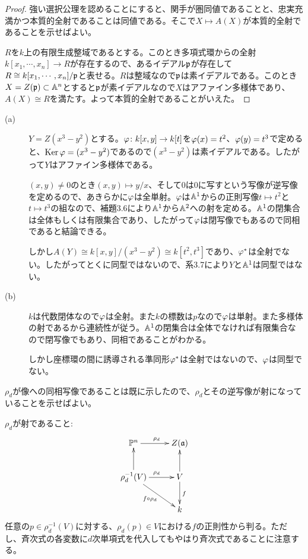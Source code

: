 \begin{proof}
  強い選択公理を認めることにすると、関手が圏同値であることと、忠実充満かつ本質的全射であることは同値である。そこで$X \mapsto A(X)$が本質的全射であることを示せばよい。

  $R$を$k$上の有限生成整域であるとする。このとき多項式環からの全射$k[x_1, \cdots , x_n] \to R$が存在するので、あるイデアル$\mathfrak{p}$が存在して$R \cong k[x_1, \cdots , x_n] / \mathfrak{p}$と表せる。$R$は整域なので$\mathfrak{p}$は素イデアルである。このとき$X = Z(\mathfrak{p}) \subset {\mathbb A}^n$とすると$\mathfrak{p}$が素イデアルなので$X$はアファイン多様体であり、$A(X) \cong R$を満たす。よって本質的全射であることがいえた。
\end{proof}


\begin{description}
  \item[(a)] $Y = Z(x^3-y^2)$とする。${\varphi} \colon k[x,y] \to k[t]$を${\varphi}(x)=t^2$、${\varphi}(y)=t^3$で定めると、$\operatorname{Ker} {\varphi} = (x^3 - y^2)$であるので$(x^3 - y^2)$は素イデアルである。したがって$Y$はアファイン多様体である。

$(x,y) \neq 0$のとき$(x,y) \mapsto y/x$、そして$0$は$0$に写すという写像が逆写像を定めるので、あきらかに${\varphi}$は全単射。${\varphi}$は${\mathbb A}^1$からの正則写像$t \mapsto t^2$と$t \mapsto t^3$の組なので、補題3.6により${\mathbb A}^1$から${\mathbb A}^2$への射を定める。${\mathbb A}^1$の閉集合は全体もしくは有限集合であり、したがって${\varphi}$は閉写像でもあるので同相であると結論できる。

しかし$A(Y) \cong k[x,y]/(x^3-y^2) \cong k[t^2,t^3]$であり、${\varphi}^*$は全射でない。したがってとくに同型ではないので、系3.7により$Y$と${\mathbb A}^1$は同型ではない。

\item[(b)] $k$は代数閉体なので${\varphi}$は全射。また$k$の標数は$p$なので${\varphi}$は単射。また多様体の射であるから連続性が従う。${\mathbb A}^1$の閉集合は全体でなければ有限集合なので閉写像でもあり、同相であることがわかる。

しかし座標環の間に誘導される準同形${\varphi}^*$は全射ではないので、${\varphi}$は同型でない。
\end{description}



$\rho_d$が像への同相写像であることは既に示したので、$\rho_d$とその逆写像が射になっていることを示せばよい。

$\rho_d$が射であること:
  \[
  \xymatrix{
  \P^n \ar[r]^{\rho_d} & Z(\fraka) \\
  \rho_d^{-1}(V) \ar[u] \ar[r]^{\rho_d} \ar[dr]_{f \circ \rho_d} & V \ar[u] \ar[d]^f \\
  {} & k
  }
  \]
  任意の$p \in \rho_d^{-1}(V)$に対する、$\rho_d(p) \in V$における$f$の正則性から判る。ただし、斉次式の各変数に$d$次単項式を代入してもやはり斉次式であることに注意する。


